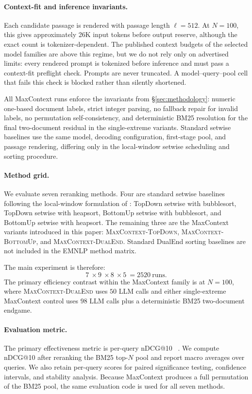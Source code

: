 \paragraph{Context-fit and inference invariants.}
Each candidate passage is rendered with passage length $\ell=512$. At
$N=100$, this gives approximately 26K input tokens before output reserve,
although the exact count is tokenizer-dependent. The published context
budgets of the selected model families are above this regime, but we do
not rely only on advertised limits: every rendered prompt is tokenized
before inference and must pass a context-fit preflight check. Prompts are
never truncated. A model--query--pool cell that fails this check is
blocked rather than silently shortened.

All MaxContext runs enforce the invariants from
\S\ref{sec:methodology}: numeric one-based document labels, strict
integer parsing, no fallback repair for invalid labels, no permutation
self-consistency, and deterministic BM25 resolution for the final
two-document residual in the single-extreme variants. Standard setwise
baselines use the same model, decoding configuration, first-stage pool,
and passage rendering, differing only in the local-window setwise
scheduling and sorting procedure.

\paragraph{Method grid.}
We evaluate seven reranking methods. Four are standard setwise baselines
following the local-window formulation of \citet{zhuang2024setwise}:
TopDown setwise with bubblesort, TopDown setwise with heapsort,
BottomUp setwise with bubblesort, and BottomUp setwise with heapsort.
The remaining three are the MaxContext variants introduced in this
paper: \textsc{MaxContext-TopDown}, \textsc{MaxContext-BottomUp}, and
\textsc{MaxContext-DualEnd}. Standard DualEnd sorting baselines are not
included in the EMNLP method matrix.

The main experiment is therefore:
\[
7\
\times 9\
\times 8\
\times 5\
= 2520\ \text{runs}.
\]
The primary efficiency contrast within the MaxContext family is at
$N=100$, where \textsc{MaxContext-DualEnd} uses $50$ LLM calls and either
single-extreme MaxContext control uses $98$ LLM calls plus a deterministic BM25 two-document endgame.

\paragraph{Evaluation metric.}
The primary effectiveness metric is per-query nDCG@10
~\citep{jarvelin2002cumulated}. We compute nDCG@10 after reranking the
BM25 top-$N$ pool and report macro averages over queries. We also retain
per-query scores for paired significance testing, confidence intervals,
and stability analysis. Because MaxContext produces a full permutation
of the BM25 pool, the same evaluation code is used for all seven
methods.

